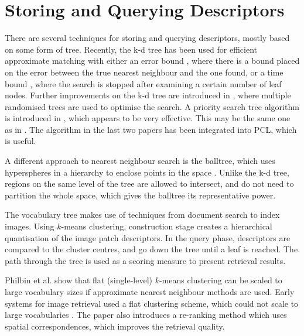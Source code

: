 \documentclass[11pt,a4paper]{kth-mag}
\begin{document}
\section{Storing and Querying Descriptors}
There are several techniques for storing and querying descriptors, mostly based
on some form of tree. Recently, the k-d tree\cite{bentley1975multidimensional,
  friedman1977algorithm} has been used for efficient approximate matching with
either an error bound \cite{arya1998optimal}, where there is a bound placed on
the error between the true nearest neighbour and the one found, or a time bound
\cite{beis1997shape}, where the search is stopped after examining a certain
number of leaf nodes. Further improvements on the k-d tree are introduced in
\cite{silpa2008optimised}, where multiple randomised trees are used to optimise
the search. A priority search tree algorithm is introduced in
\cite{muja2014scalable}, which appears to be very effective. This may be the
same one as in \cite{muja2009fast}. The algorithm in the last two papers has
been integrated into PCL, which is useful.

A different approach to nearest neighbour search is the balltree, which uses
hyperspheres in a hierarchy to enclose points in the space
\cite{omohundro1989five}. Unlike the k-d tree, regions on the same level of the
tree are allowed to intersect, and do not need to partition the whole space,
which gives the balltree its representative power.

The vocabulary tree \cite{nister2006scalable} makes use of techniques from
document search to index images. Using $k$-means clustering, construction stage
creates a hierarchical quantisation of the image patch descriptors. In the query
phase, descriptors are compared to the cluster centres, and go down the tree
until a leaf is reached. The path through the tree is used as a scoring measure
to present retrieval results.

Philbin et al. \cite{philbin2007object} show that flat (single-level) $k$-means
clustering can be scaled to large vocabulary sizes if approximate nearest
neighbour methods are used. Early systems for image retrieval used a flat
clustering scheme, which could not scale to large vocabularies
\cite{sivic2003video}. The paper also introduces a re-ranking method which uses
spatial correspondences, which improves the retrieval quality.
\end{document}
